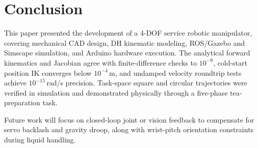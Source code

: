 \documentclass[conference]{IEEEtran}
\begin{document}
\section{Conclusion}

This paper presented the development of a 4-DOF service robotic manipulator, covering mechanical CAD design, DH kinematic modeling, ROS/Gazebo and Simscape simulation, and Arduino hardware execution. The analytical forward kinematics and Jacobian agree with finite-difference checks to $10^{-9}$, cold-start position IK converges below $10^{-4}$\,m, and undamped velocity roundtrip tests achieve $10^{-15}$\,rad/s precision. Task-space square and circular trajectories were verified in simulation and demonstrated physically through a five-phase tea-preparation task.

Future work will focus on closed-loop joint or vision feedback to compensate for servo backlash and gravity droop, along with wrist-pitch orientation constraints during liquid handling.
\end{document}

